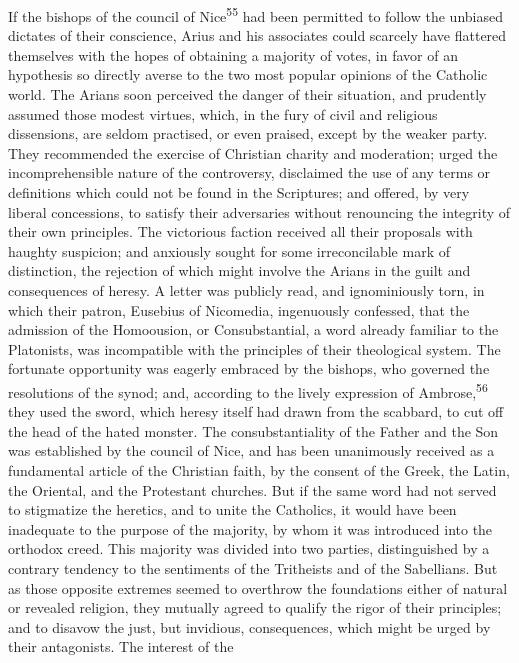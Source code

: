 If the bishops of the council of Nice\textsuperscript{55} had been permitted to
follow the unbiased dictates of their conscience, Arius and his
associates could scarcely have flattered themselves with the
hopes of obtaining a majority of votes, in favor of an hypothesis
so directly averse to the two most popular opinions of the
Catholic world. The Arians soon perceived the danger of their
situation, and prudently assumed those modest virtues, which, in
the fury of civil and religious dissensions, are seldom
practised, or even praised, except by the weaker party. They
recommended the exercise of Christian charity and moderation;
urged the incomprehensible nature of the controversy, disclaimed
the use of any terms or definitions which could not be found in
the Scriptures; and offered, by very liberal concessions, to
satisfy their adversaries without renouncing the integrity of
their own principles. The victorious faction received all their
proposals with haughty suspicion; and anxiously sought for some
irreconcilable mark of distinction, the rejection of which might
involve the Arians in the guilt and consequences of heresy. A
letter was publicly read, and ignominiously torn, in which their
patron, Eusebius of Nicomedia, ingenuously confessed, that the
admission of the Homoousion, or Consubstantial, a word already
familiar to the Platonists, was incompatible with the principles
of their theological system. The fortunate opportunity was
eagerly embraced by the bishops, who governed the resolutions of
the synod; and, according to the lively expression of Ambrose,\textsuperscript{56}
they used the sword, which heresy itself had drawn from the
scabbard, to cut off the head of the hated monster. The
consubstantiality of the Father and the Son was established by
the council of Nice, and has been unanimously received as a
fundamental article of the Christian faith, by the consent of the
Greek, the Latin, the Oriental, and the Protestant churches. But
if the same word had not served to stigmatize the heretics, and
to unite the Catholics, it would have been inadequate to the
purpose of the majority, by whom it was introduced into the
orthodox creed. This majority was divided into two parties,
distinguished by a contrary tendency to the sentiments of the
Tritheists and of the Sabellians. But as those opposite extremes
seemed to overthrow the foundations either of natural or revealed
religion, they mutually agreed to qualify the rigor of their
principles; and to disavow the just, but invidious, consequences,
which might be urged by their antagonists. The interest of the
